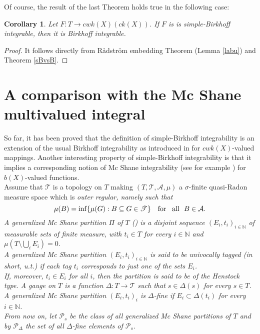 \documentclass[11pt,a4paper,twoside]{amsart}
\newtheorem{corollary}[theorem]{Corollary}
\begin{document}
Of course, the result of the last Theorem holds true in the following case:
\begin{corollary}
Let $F: T \to cwk(X) (ck(X))$. If $F$ is  is simple-Birkhoff integrable, then it is Birkhoff integrable. 
\end{corollary}
\begin{proof}
It follows directly from  R{\aa}dstr\"{o}m embedding Theorem (Lemma \ref{labu}) and Theorem \ref{sBvsB}.
\end{proof}
\section{A comparison with the Mc Shane multivalued integral}\label{four}
\noindent
So far, it has been proved that the definition of simple-Birkhoff integrability is an extension of the usual Birkhoff integrability as introduced in \cite{cr2004} for $cwk(X)$-valued mappings. Another interesting property of simple-Birkhoff integrability is that it implies a corresponding notion of Mc Shane integrability (see for example \cite{bms2011}) for $b(X)$-valued functions.\\

Assume that  $\mathscr{T}$ is a topology on $T$
 making $(T,\mathscr{T}, {{\mathcal{A}}}, \mu)$ a $\sigma$-finite quasi-Radon
 measure space which is \em outer regular, \rm namely such that
 $$\mu(B)=\inf \{ \mu(G):B \subseteq G \in \mathscr{T} \}\quad \mbox{for \, all  \,}
\, B \in {{\mathcal{A}}} .$$
\noindent A \em generalized Mc Shane partition \rm $\Pi$ of $T$
(\cite[Definitions 1A]{F2}) is a disjoint sequence $(E_i, t_i)_{i \in \mathbb{N}}$
of measurable sets of finite measure, with $t_i \in T$ for every $i \in \mathbb{N}$ and
$\mu(T \setminus \bigcup_i E_i)=0$. \\
A generalized Mc Shane partition  $(E_i, t_i)_{i \in \mathbb{N}}$ is said to be {\em univocally tagged} (in short, u.t.)
if each tag $t_i$ corresponds to just one of the sets $E_i$.
\\
If, moreover, $t_i\in E_i$ for all $i$, then the partition is said to be of the {\em Henstock} type.
A \em gauge \rm on $T$ is a function $\Delta: T \rightarrow \mathscr{T}$ such that $s \in \Delta(s)$ for every $s \in T$.
A generalized Mc Shane partition $(E_i,t_i)_i$ is \em  $\Delta$-fine \rm if $E_i \subset \Delta(t_i)$ for every $i \in \mathbb{N}$.\\
From now on, let ${{\mathcal{P}}}_s$ be the class of all generalized Mc Shane partitions of $T$
and by ${{\mathcal{P}}}_{\Delta}$  the set of all \mbox{$\Delta$}-fine elements of ${{\mathcal{P}}}_s$.\\
\end{document}
